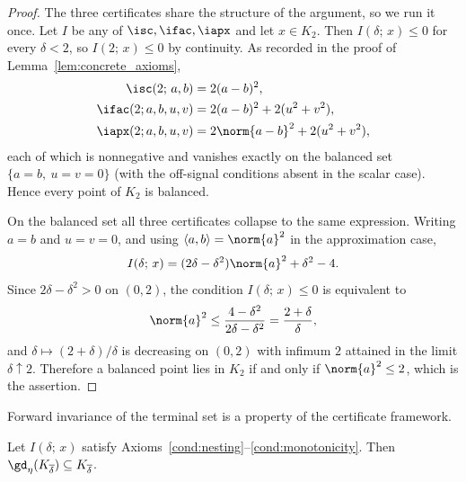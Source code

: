\documentclass{article}
\begin{document}
\begin{proof}
The three certificates share the structure of the argument, so we run it once.
Let $I$ be any of $\isc,\ifac,\iapx$ and let $x\in K_2$. Then $I(\delta;\,x)\le0$
for every $\delta<2$, so $I(2;\,x)\le0$ by continuity. As recorded in the proof
of Lemma~\ref{lem:concrete_axioms},
\begin{align}
    \isc(2;\,a,b)&=2(a-b)^2,
    \notag\\
    \ifac(2;a,b,u,v)&=2(a-b)^2+2(u^2+v^2),
    \notag\\
    \iapx(2;a,b,u,v)&=2\norm{a-b}^2+2(u^2+v^2),
\end{align}
each of which is nonnegative and vanishes exactly on the balanced set
$\{a=b,\ u=v=0\}$ (with the off-signal conditions absent in the scalar case).
Hence every point of $K_2$ is balanced.

On the balanced set all three certificates collapse to the same expression.
Writing $a=b$ and $u=v=0$, and using $\langle a,b\rangle=\norm{a}^2$ in the
approximation case,
\begin{align}
    I(\delta;\,x)
    =
    (2\delta-\delta^2)\norm{a}^2+\delta^2-4 .
    \label{eq:balanced_certificate}
\end{align}
Since $2\delta-\delta^2>0$ on $(0,2)$, the condition $I(\delta;\,x)\le0$ is
equivalent to
\begin{align}
    \norm{a}^2
    \le
    \frac{4-\delta^2}{2\delta-\delta^2}
    =
    \frac{2+\delta}{\delta},
    \label{eq:balanced_ineq}
\end{align}
and $\delta\mapsto(2+\delta)/\delta$ is decreasing on $(0,2)$ with infimum $2$
attained in the limit $\delta\uparrow2$. Therefore a balanced point lies in
$K_2$ if and only if $\norm{a}^2\le2$, which is the assertion.
\end{proof}

Forward invariance of the terminal set is a property of the certificate
framework.

\begin{lemma}
\label{lem:terminal_forward_invariance}
Let $I(\delta;\,x)$ satisfy
Axioms~\ref{cond:nesting}--\ref{cond:monotonicity}. Then
$\gd_\eta(K_{\overline\delta})\subseteq K_{\overline\delta}$.
\end{lemma}
\end{document}
